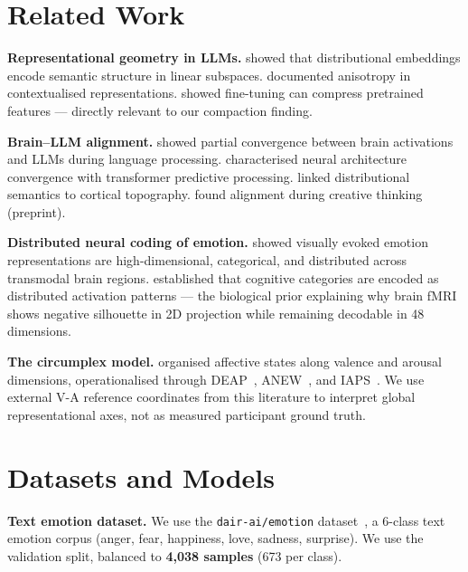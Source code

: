 \documentclass{article}
\begin{document}
\section{Related Work}

\textbf{Representational geometry in LLMs.}
\citet{mikolov2013} showed that distributional embeddings encode semantic structure in
linear subspaces.
\citet{ethayarajh2019} documented anisotropy in contextualised representations.
\citet{kumar2022} showed fine-tuning can compress pretrained features --- directly
relevant to our compaction finding.

\textbf{Brain--LLM alignment.}
\citet{caucheteux2022} showed partial convergence between brain activations and LLMs
during language processing.
\citet{schrimpf2021} characterised neural architecture convergence with transformer
predictive processing.
\citet{huth2016} linked distributional semantics to cortical topography.
\citet{ismayilzada2026} found alignment during creative thinking (preprint).

\textbf{Distributed neural coding of emotion.}
\citet{horikawa2020} showed visually evoked emotion representations are high-dimensional,
categorical, and distributed across transmodal brain regions.
\citet{haxby2001} established that cognitive categories are encoded as distributed
activation patterns --- the biological prior explaining why brain fMRI shows negative
silhouette in 2D projection while remaining decodable in 48 dimensions.

\textbf{The circumplex model.}
\citet{russell1980} organised affective states along valence and arousal dimensions,
operationalised through DEAP~\citep{koelstra2012}, ANEW~\citep{bradley1999}, and
IAPS~\citep{lang2008}.
We use external V-A reference coordinates from this literature to interpret global
representational axes, not as measured participant ground truth.

\section{Datasets and Models}

\textbf{Text emotion dataset.}
We use the \texttt{dair-ai/emotion} dataset~\citep{saravia2018}, a 6-class text emotion
corpus (anger, fear, happiness, love, sadness, surprise).
We use the validation split, balanced to \textbf{4,038 samples} (673 per class).
\end{document}
